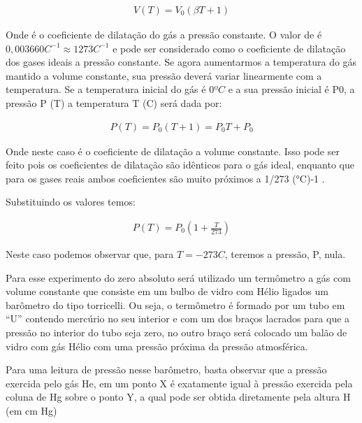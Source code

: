 \documentclass[a4paper]{ltxdoc}
\numberwithin{equation}{section}
\begin{document}
\vspace{\baselineskip}

\begin{align}
    V(T)=V_0(\beta T + 1)
\end{align}

\vspace{\baselineskip}


Onde é o coeficiente de dilatação do gás a pressão constante. O valor de  é $0,003660 C^{-1} \approx 1273 C^{-1}$ e pode ser considerado como o coeficiente de dilatação dos gases ideais a pressão constante. 
Se agora aumentarmos a temperatura do gás mantido a volume constante, sua pressão deverá variar linearmente com a temperatura. Se a temperatura inicial do gás é $0ºC$ e a sua pressão inicial é P0, a pressão P (T) a temperatura T (C) será dada por:

\begin{align}
    P(T) = P_0(T+1) = P_0T+ P_0
\end{align}

Onde  neste caso é o coeficiente de dilatação a volume constante. Isso pode ser feito pois os coeficientes de dilatação são idênticos para o gás ideal, enquanto que para os gases reais ambos coeficientes são muito próximos a 1/273 (°C)-1 . 

\vspace{\baselineskip}

Substituindo os valores temos: 


\begin{align}
    P(T)=P_0(1 + \frac{T}{273} )
\end{align}

 Neste caso podemos observar que, para $T = - 273 C$, teremos a pressão, P, nula.

 \vspace{\baselineskip}

Para esse experimento do zero absoluto será utilizado um termômetro a gás com volume constante que consiste em um bulbo de vidro com Hélio ligados um barômetro do tipo torricelli. Ou seja, o termômetro é formado por um tubo em “U” contendo mercúrio no seu interior e com um dos braços lacrados para que a pressão no interior do tubo seja zero, no outro braço será colocado um balão de vidro com gás Hélio com uma pressão próxima da pressão atmosférica.

 \vspace{\baselineskip}

Para uma leitura de pressão nesse barômetro, basta observar que a pressão exercida pelo gás He, em um ponto X é exatamente igual à pressão exercida pela coluna de Hg sobre o ponto Y, a qual pode ser obtida diretamente pela altura H (em cm Hg)
\end{document}
